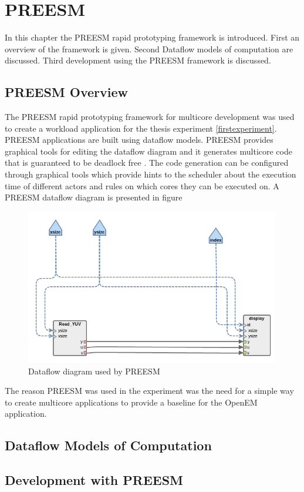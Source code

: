 \chapter{PREESM}
\label{chapter:preesm}
In this chapter the PREESM rapid prototyping framework is introduced. First an
overview of the framework is given. Second Dataflow models of computation are
discussed. Third development using the PREESM framework is discussed.

\section{PREESM Overview}
\label{sec:preesmover}
The PREESM rapid prototyping framework for multicore development was used to
create a workload application for the thesis experiment \ref{firstexperiment}.
PREESM applications are built using dataflow models. PREESM provides graphical
tools for editing the dataflow diagram and it generates multicore code that is
guaranteed to be deadlock free \cite{pelcat2014preesm}. The code generation can
be configured through graphical tools which provide hints to the scheduler about
the execution time of different actors and rules on which cores they can be
executed on. A PREESM dataflow diagram is presented in figure

\begin{figure}[h!] \label{preesm_example} \begin{center}
    \includegraphics[width=0.99\textwidth]{images/example_preesm_diagram.png}
    \caption{Dataflow diagram used by PREESM} \end{center}
\end{figure}
The reason PREESM was used in the experiment was the need for a simple way to
create multicore applications to provide a baseline for the OpenEM application.

\section{Dataflow Models of Computation}
\label{sec:dataflow}

\section{Development with PREESM}
\label{sec:preesmdev}
